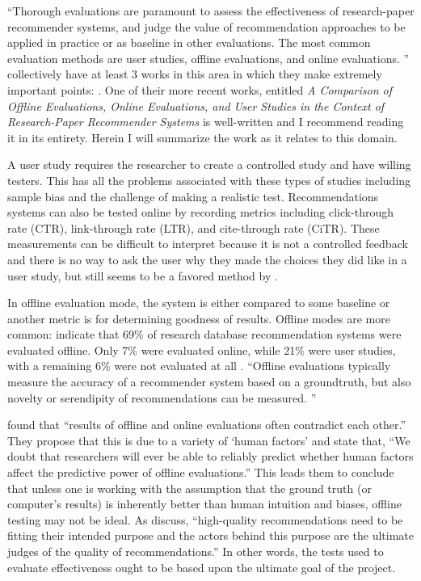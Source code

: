 ``Thorough evaluations are paramount to assess the effectiveness of research-paper recommender systems, and judge the value of recommendation approaches to be applied in practice or as baseline in other evaluations. The most common evaluation methods are user studies, offline evaluations, and online evaluations. \citep{comparison_2015}'' \cite{meta_recommender_evaluation_2013} collectively have at least 3 works in this area in which they make extremely important points: \cite{comparison_2015, comparative_analysis_2013, meta_recommender_evaluation_2013}. One of their more recent works, entitled \textit{A Comparison of Offline Evaluations, Online Evaluations, and User Studies in the Context of Research-Paper Recommender Systems} \citep{comparison_2015} is well-written and I recommend reading it in its entirety. Herein I will summarize the work as it relates to this domain.

A user study requires the researcher to create a controlled study and have willing testers. This has all the problems associated with these types of studies including sample bias and the challenge of making a realistic test. Recommendations systems can also be tested online by recording metrics including click-through rate (CTR), link-through rate (LTR), and cite-through rate (CiTR). These measurements can be difficult to interpret because it is not a controlled feedback and there is no way to ask the user why they made the choices they did like in a user study, but still seems to be a favored method by \cite{comparison_2015}.

In offline evaluation mode, the system is either compared to some baseline or another metric is for determining goodness of results. Offline modes are more common: \cite{meta_recommender_evaluation_2013} indicate that 69\% of research database recommendation systems were evaluated offline. Only 7\% were evaluated online, while 21\% were user studies, with a remaining 6\% were not evaluated at all \citep{comparison_2015}. ``Offline evaluations typically measure the accuracy of a recommender system based on a groundtruth, but also novelty or serendipity of recommendations can be measured. \citep{Ge:2010:BAE:1864708.1864761}''

\cite{comparative_analysis_2013} found that ``results of offline and online evaluations often contradict each other.'' They propose that this is due to a variety of `human factors' and state that, ``We doubt that researchers will ever be able to reliably predict whether human factors affect the predictive power of offline evaluations.'' This leads them to conclude that unless one is working with the assumption that the ground truth (or computer's results) is inherently better than human intuition and biases, offline testing may not be ideal. As \cite{Ge:2010:BAE:1864708.1864761} discuss, ``high-quality recommendations need to be fitting their intended purpose and the actors behind this purpose are the ultimate judges of the quality of recommendations.'' In other words, the tests used to evaluate effectiveness ought to be based upon the ultimate goal of the project.  

